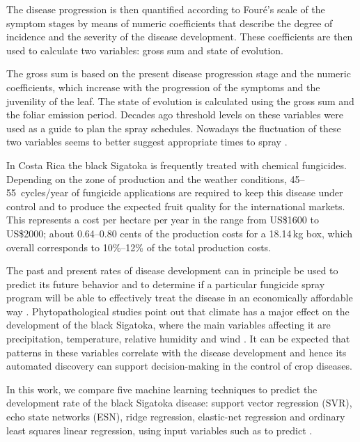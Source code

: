 The disease progression is then quantified according to Fouré's scale
of the symptom stages \citep{foure1988} by means of numeric
coefficients that describe the degree of incidence and the severity of
the disease development.  These coefficients are then used to
calculate two variables: gross sum and state of evolution.

The gross sum is based on the present disease progression stage and
the numeric coefficients, which increase with the progression of
the symptoms and the juvenility of the leaf.
%
The state of evolution is calculated using the gross sum and the
foliar emission period.
%
Decades ago threshold levels on these variables were used as a guide
to plan the spray schedules.  Nowadays the fluctuation of these two
variables seems to better suggest appropriate times to spray
\citep{Marinetal2003}.

In Costa Rica the black Sigatoka is frequently treated with
chemical fungicides.
%
Depending on the zone of production and the weather conditions,
45--55~cycles/year of fungicide applications are required to keep this
disease under control and to produce the expected fruit quality for the
international markets.
%
This represents a cost per hectare per year in the range from US\$1600
to US\$2000; about 0.64--0.80 cents of the production costs for a
18.14\,kg box, which overall corresponds to 10\%--12\% of the total
production costs.

The past and present rates of disease development can in principle be
used to predict its future behavior and to determine if a particular
fungicide spray program will be able to effectively treat the disease
in an economically affordable way \citep{ChuangJeger1987}.
%
Phytopathological studies point out that climate has a major effect on
the development of the black Sigatoka, where the main variables
affecting it are precipitation, temperature, relative humidity and
wind \citep{MarinVargas1995}.  It can be expected that patterns in
these variables correlate with the disease development and hence its
automated discovery can support decision-making in the control of crop
diseases.

In this work, we compare five machine learning techniques to predict
the development rate of the black Sigatoka disease: support vector
regression (SVR), echo state networks (ESN), ridge regression,
elastic-net regression and ordinary least squares linear regression,
using input variables such as  to predict .

